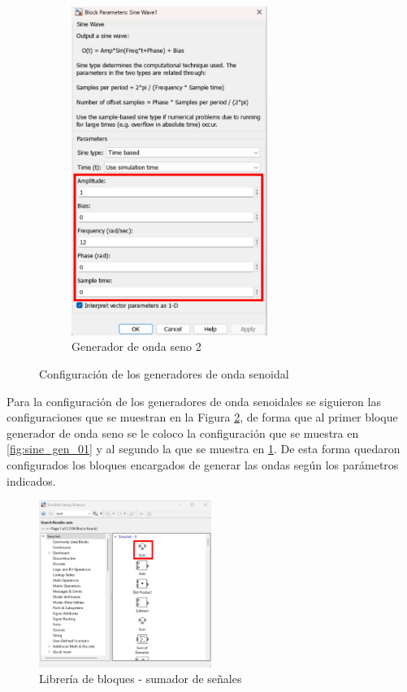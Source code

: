 \begin{figure}[htbp]
\begin{subfigure}[b]{0.45\textwidth}
        \includegraphics[width=0.7\textwidth]{fig/especifico_2/CASO_ESTUDIO_FILTRO/sinewave_2.pdf}
        \caption{Generador de onda seno 2}
        \label{fig:sine_gen_02}
    \end{subfigure}
    \caption{Configuración de los generadores de onda senoidal}
    \label{fig:sine_wave_generators_config}
\end{figure}

Para la configuración de los generadores de onda senoidales se siguieron las configuraciones que se muestran en la Figura \ref{fig:sine_wave_generators_config}, de forma que al primer bloque generador de onda seno se le coloco la configuración que se muestra en \ref{fig:sine_gen_01} y al segundo la que se muestra en \ref{fig:sine_gen_02}. De esta forma quedaron configurados los bloques encargados de generar las ondas según los parámetros indicados.


\begin{figure}[h!]
    \centering
    \includegraphics[width=0.5\textwidth]{fig/especifico_2/CASO_ESTUDIO_FILTRO/sum_0.pdf}
    \caption{Librería de bloques - sumador de señales}
    \label{fig:lib_bloq_sum}
\end{figure}


